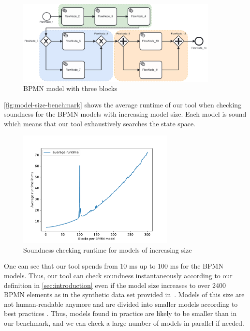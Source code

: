 \documentclass[runningheads]{llncs}
\begin{document}
\begin{figure}[ht]
	\centering
	\includegraphics[width=0.9\textwidth]{images/three-blocks}
	\caption{BPMN model with three blocks~\cite{krauterHigherorderTransformationApproach2023}}
	\label{fig:three-block-example}
\end{figure}

\autoref{fig:model-size-benchmark} shows the average runtime of our tool when checking soundness for the BPMN models with increasing model size.
Each model is sound which means that our tool exhaustively searches the state space.

\begin{figure}[ht]
	\centering
	\includegraphics[width=0.7\textwidth]{images/model-size-benchmark}
	\caption{Soundness checking runtime for models of increasing size}
	\label{fig:model-size-benchmark}
\end{figure}

One can see that our tool spends from 10 ms up to 100 ms for the BPMN models.
Thus, our tool can check soundness instantaneously according to our definition in \autoref{sec:introduction} even if the model size increases to over 2400 BPMN elements as in the synthetic data set provided in~\cite{krauterHigherorderTransformationApproach2023}.
Models of this size are not human-readable anymore and are divided into smaller models according to best practices \cite{fahlandAnalysisDemandInstantaneous2011}.
Thus, models found in practice are likely to be smaller than in our benchmark, and we can check a large number of models in parallel if needed.
\end{document}
